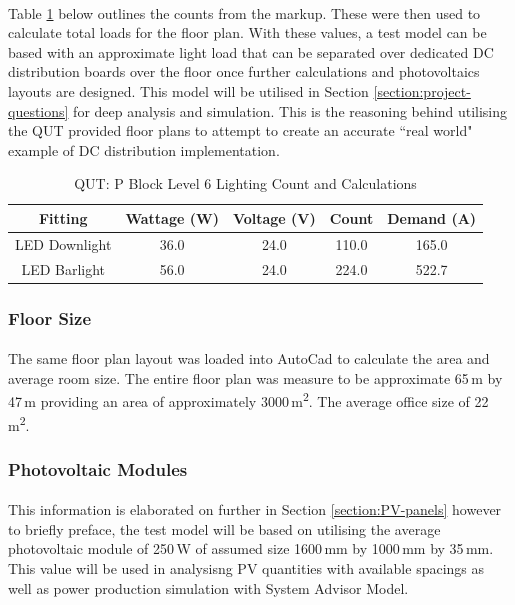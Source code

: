 \paragraph{}
Table \ref{table:QUTlvl6-count} below outlines the counts from the markup. These were then used to calculate total loads for the floor plan. With these values, a test model can be based with an approximate light load that can be separated over dedicated DC distribution boards over the floor once further calculations and photovoltaics layouts are designed. This model will be utilised in Section \ref{section:project-questions} for deep analysis and simulation. This is the reasoning behind utilising the QUT provided floor plans to attempt to create an accurate ``real world" example of DC distribution implementation.     

\begin{table}[!ht]
	\centering
	\renewcommand{\arraystretch}{2}
	\begin{tabular}{|c|c|c|c|c|}
		\hline
		\textbf{Fitting} & \textbf{Wattage (W)} & \textbf{Voltage (V)} & \textbf{Count} & \textbf{Demand (A)} \\ \hline
		LED Downlight & 36.0 & 24.0 & 110.0 & 165.0 \\ \hline
		LED Barlight & 56.0 & 24.0 & 224.0 & 522.7 \\ \hline
	\end{tabular}

	\caption{QUT: P Block Level 6 Lighting Count and Calculations}
	\label{table:QUTlvl6-count}
\end{table}

\subsubsection{Floor Size}

\paragraph{}
The same floor plan layout was loaded into AutoCad to calculate the area and average room size. The entire floor plan was measure to be approximate 65\,m by 47\,m providing an area of approximately 3000\,\si{m^2}. The average office size of 22\,\si{m^2}. 

\subsubsection{Photovoltaic Modules}

\paragraph{}
This information is elaborated on further in Section \ref{section:PV-panels} however to briefly preface, the test model will be based on utilising the average photovoltaic module of 250\,W of assumed size 1600\,mm by 1000\,mm by 35\,mm. This value will be used in analysisng PV quantities with available spacings as well as power production simulation with System Advisor Model. 

